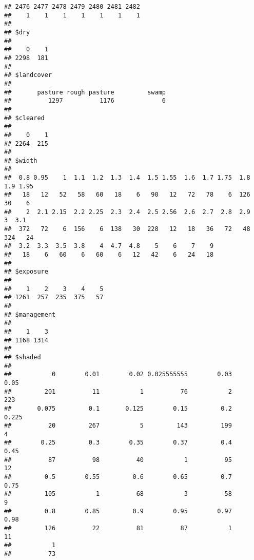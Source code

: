 \documentclass[]{article}
\newenvironment{Shaded}{\begin{snugshade}}{\end{snugshade}}
\newcommand{\CommentTok}[1]{\textcolor[rgb]{0.56,0.35,0.01}{\textit{#1}}}
\newcommand{\DataTypeTok}[1]{\textcolor[rgb]{0.13,0.29,0.53}{#1}}
\newcommand{\KeywordTok}[1]{\textcolor[rgb]{0.13,0.29,0.53}{\textbf{#1}}}
\newcommand{\NormalTok}[1]{#1}
\newcommand{\OperatorTok}[1]{\textcolor[rgb]{0.81,0.36,0.00}{\textbf{#1}}}
\newcommand{\StringTok}[1]{\textcolor[rgb]{0.31,0.60,0.02}{#1}}
\begin{document}
\begin{verbatim}
## 2476 2477 2478 2479 2480 2481 2482 
##    1    1    1    1    1    1    1 
## 
## $dry
## 
##    0    1 
## 2298  181 
## 
## $landcover
## 
##       pasture rough pasture         swamp 
##          1297          1176             6 
## 
## $cleared
## 
##    0    1 
## 2264  215 
## 
## $width
## 
##  0.8 0.95    1  1.1  1.2  1.3  1.4  1.5 1.55  1.6  1.7 1.75  1.8  1.9 1.95 
##   18   12   52   58   60   18    6   90   12   72   78    6  126   30    6 
##    2  2.1 2.15  2.2 2.25  2.3  2.4  2.5 2.56  2.6  2.7  2.8  2.9    3  3.1 
##  372   72    6  156    6  138   30  228   12   18   36   72   48  324   24 
##  3.2  3.3  3.5  3.8    4  4.7  4.8    5    6    7    9 
##   18    6   60    6   60    6   12   42    6   24   18 
## 
## $exposure
## 
##    1    2    3    4    5 
## 1261  257  235  375   57 
## 
## $management
## 
##    1    3 
## 1168 1314 
## 
## $shaded
## 
##           0        0.01        0.02 0.025555555        0.03        0.05 
##         201          11           1          76           2         223 
##       0.075         0.1       0.125        0.15         0.2       0.225 
##          20         267           5         143         199           4 
##        0.25         0.3        0.35        0.37         0.4        0.45 
##          87          98          40           1          95          12 
##         0.5        0.55         0.6        0.65         0.7        0.75 
##         105           1          68           3          58           9 
##         0.8        0.85         0.9        0.95        0.97        0.98 
##         126          22          81          87           1          11 
##           1 
##          73
\end{verbatim}

\begin{Shaded}
\end{Shaded}
\end{document}
